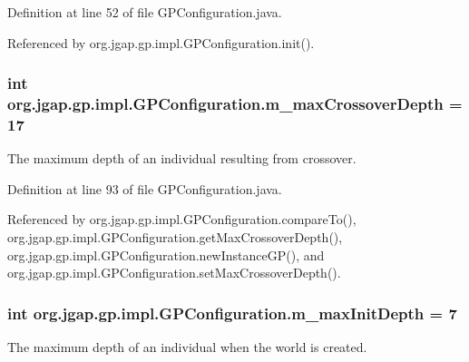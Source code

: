 Definition at line 52 of file G\-P\-Configuration.\-java.



Referenced by org.\-jgap.\-gp.\-impl.\-G\-P\-Configuration.\-init().

\hypertarget{classorg_1_1jgap_1_1gp_1_1impl_1_1_g_p_configuration_a69bbcc24fa4b350fa5da14070ae61740}{
\subsubsection[{m\-\_\-max\-Crossover\-Depth}]{\setlength{\rightskip}{0pt plus 5cm}int org.\-jgap.\-gp.\-impl.\-G\-P\-Configuration.\-m\-\_\-max\-Crossover\-Depth = 17\hspace{0.3cm}{\ttfamily [private]}}}\label{classorg_1_1jgap_1_1gp_1_1impl_1_1_g_p_configuration_a69bbcc24fa4b350fa5da14070ae61740}
The maximum depth of an individual resulting from crossover. 

Definition at line 93 of file G\-P\-Configuration.\-java.



Referenced by org.\-jgap.\-gp.\-impl.\-G\-P\-Configuration.\-compare\-To(), org.\-jgap.\-gp.\-impl.\-G\-P\-Configuration.\-get\-Max\-Crossover\-Depth(), org.\-jgap.\-gp.\-impl.\-G\-P\-Configuration.\-new\-Instance\-G\-P(), and org.\-jgap.\-gp.\-impl.\-G\-P\-Configuration.\-set\-Max\-Crossover\-Depth().

\hypertarget{classorg_1_1jgap_1_1gp_1_1impl_1_1_g_p_configuration_ab372fad0a650dd4f56857750f263176f}{
\subsubsection[{m\-\_\-max\-Init\-Depth}]{\setlength{\rightskip}{0pt plus 5cm}int org.\-jgap.\-gp.\-impl.\-G\-P\-Configuration.\-m\-\_\-max\-Init\-Depth = 7\hspace{0.3cm}{\ttfamily [private]}}}\label{classorg_1_1jgap_1_1gp_1_1impl_1_1_g_p_configuration_ab372fad0a650dd4f56857750f263176f}
The maximum depth of an individual when the world is created. 


